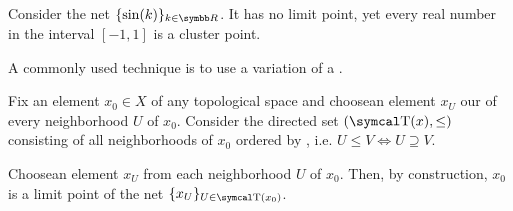 \begin{example}\label{ex:cluster_points/sine}
  Consider the net \( \{ \sin(k) \}_{k \in \BR} \). It has no limit point, yet every real number in the interval \( [-1, 1] \) is a cluster point.
\end{example}

\begin{example}\label{ex:reverse_inclusion_net}
  A commonly used technique is to use a variation of a .

  Fix an element \( x_0 \in X \) of any topological space and choose\LEM an element \( x_U \) our of every neighborhood \( U \) of \( x_0 \). Consider the directed set \( (\CT(x), \leq) \) consisting of all neighborhoods of \( x_0 \) ordered by , i.e. \( U \leq V \iff U \supseteq V \).

  Choose\LEM an element \( x_U \) from each neighborhood \( U \) of \( x_0 \). Then, by construction, \( x_0 \) is a limit point of the net \( \{ x_U \}_{U \in \CT(x_0)} \).
\end{example}

